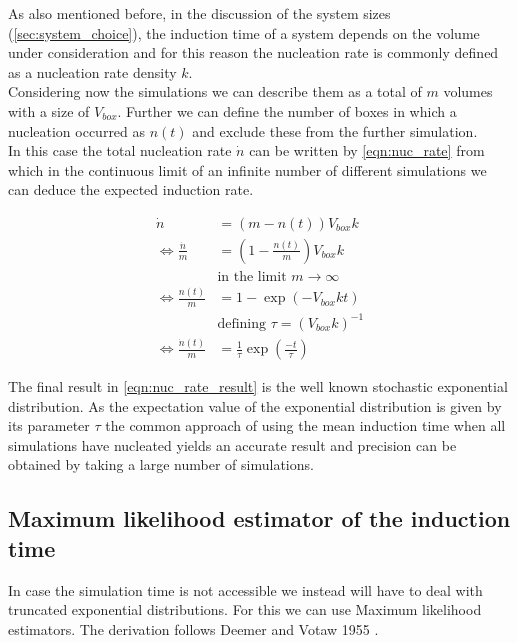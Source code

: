 As also mentioned before, in the discussion of the system sizes (\autoref{sec:system_choice}), the induction time of a system depends on the volume under consideration and for this reason the nucleation rate is commonly defined as a nucleation rate density $k$.\\ 
Considering now the simulations we can describe them as a total of $m$ volumes with a size of $V_{box}$.  Further we can define the number of boxes in which a nucleation occurred as $n(t)$ and exclude these from the further simulation.\\

In this case the total nucleation rate $ \dot{n} $ can be written by \autoref{eqn:nuc_rate} from which in the continuous limit of an infinite number of different simulations we can deduce the expected induction rate.

\begin{align}
\label{eqn:nuc_rate}
\dot{n} &= (m - n(t))V_{box}k\\
\Leftrightarrow \frac{\dot{n}}{m} &= (1 - \frac{n(t)}{m})V_{box}k\\
 &  \text{in the limit } m \rightarrow \infty \nonumber\\
\Leftrightarrow \frac{n(t)}{m} &= 1 - \exp\left( -V_{box} k t \right)\\
 &  \text{defining } \tau = (V_{box} k)^{-1} \nonumber\\
\label{eqn:nuc_rate_result}
\Leftrightarrow \frac{\dot{n}(t)}{m} &= \frac{1}{\tau} \exp\left( \frac{-t}{\tau} \right) 
\end{align}

The final result in \autoref{eqn:nuc_rate_result} is the well known stochastic exponential distribution. As the expectation value of the exponential distribution is given by its parameter $\tau$ the common approach of using the mean induction time when all simulations have nucleated yields an accurate result and precision can be obtained by taking a large number of simulations.\\


\subsection{Maximum likelihood estimator of the induction time}
\label{sec:ml_estimator}
In case the simulation time is not accessible we instead will have to deal with truncated exponential distributions. For this we can use Maximum likelihood estimators. The derivation follows Deemer and Votaw 1955 \cite{Deemer1955}.\\

